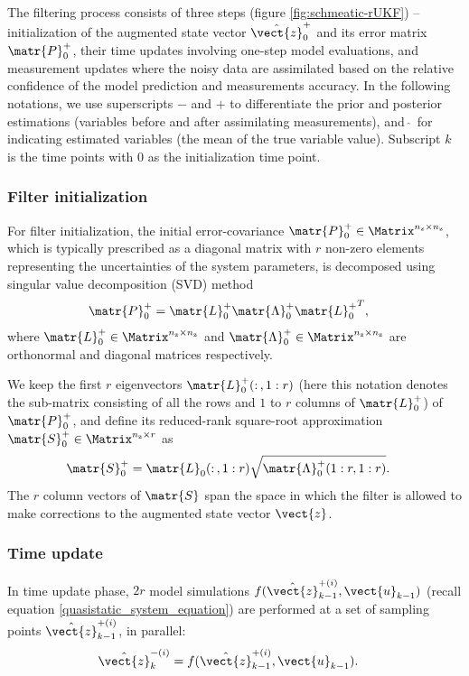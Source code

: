 The filtering process consists of three steps (figure \ref{fig:schmeatic-rUKF}) -- initialization of the augmented state vector $\hat{\vect{z}}_{0}^{+}$ and its error matrix $\matr{P}_0^+$, their time updates involving one-step model evaluations, and measurement updates where the noisy data are assimilated based on the relative confidence of the model prediction and measurements accuracy.   In the following notations, we use superscripts $-$ and $+$ to differentiate the prior and posterior estimations (variables before and after assimilating measurements), and $\, \hat{ } \, $  for indicating estimated variables (the mean of the true variable value). Subscript $k$ is the time points with $0$ as the initialization time point.

\subsubsection*{Filter initialization}
For filter initialization, the initial error-covariance $\matr{P}_0^+  \in \Matrix^{n_\textnormal{z} \times n_\textnormal{z}}$, which is typically prescribed as a diagonal matrix with $r$ non-zero elements representing the uncertainties of the system parameters, is decomposed using singular value decomposition (SVD) method
\begin{align}
\matr{P}_0^+ &= \matr{L}_0^+ \matr{\Lambda}_0^+ {\matr{L}_0^+}^T , \label{eq-SEUK-initialization-01}
\end{align}
where $\matr{L}_0^+ \in \Matrix^{n_\textnormal{z} \times n_\textnormal{z}}$ and $\matr{\Lambda}_0^+ \in \Matrix^{n_\textnormal{z} \times n_\textnormal{z}}$ are orthonormal and diagonal matrices respectively.

We keep the first $r$ eigenvectors $\matr{L}_0^+(: \, ,1:r)$ (here this notation denotes the sub-matrix consisting of all the rows and $1$ to $r$ columns of $\matr{L}_0^+$) of $\matr{P}_0^+$, and define its reduced-rank square-root approximation $\matr{S}_0^+ \in \Matrix^{n_\textnormal{z} \times r}$ as
\begin{align}
\matr{S}_0^+ &= \matr{L}_0(: \, ,1:r)\sqrt{\matr{\Lambda}_0^+(1:r,1:r)}. \label{eq-SEUK-initialization-02}
\end{align}
The $r$ column vectors of $\matr{S}$ span the space in which the filter is allowed to make corrections to the augmented state vector $\vect{z}$.

\subsubsection*{Time update}
In time update phase, $2r$ model simulations $f(\hat{\vect{z}}_{k-1}^{+(i)},\vect{u}_{k-1})$ (recall equation \ref{quasistatic_system_equation}) are performed at a set of sampling points $\hat{\vect{z}}_{k-1}^{+(i)}$, in parallel:
\begin{align}
\hat{\vect{z}}_k^{-(i)} &= f(\hat{\vect{z}}_{k-1}^{+(i)},\vect{u}_{k-1}).
\end{align}

